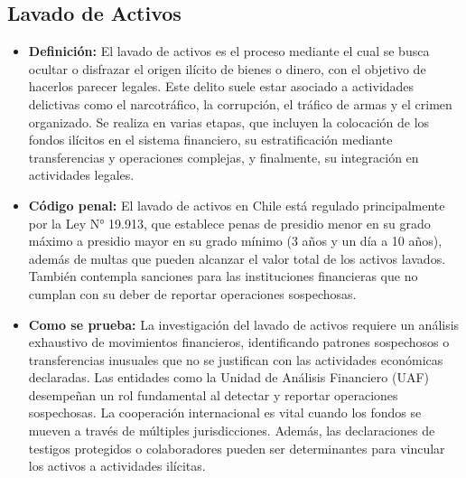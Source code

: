 \documentclass[letter,12pt]{article}
\begin{document}
	\subsection{Lavado de Activos}
	\begin{itemize}
		\item \textbf{Definición: }El lavado de activos es el proceso mediante el cual se busca ocultar o disfrazar el origen ilícito de bienes o dinero, con el objetivo de hacerlos parecer legales. Este delito suele estar asociado a actividades delictivas como el narcotráfico, la corrupción, el tráfico de armas y el crimen organizado. Se realiza en varias etapas, que incluyen la colocación de los fondos ilícitos en el sistema financiero, su estratificación mediante transferencias y operaciones complejas, y finalmente, su integración en actividades legales.\\
		\newpage
		
		\item \textbf{Código penal: }El lavado de activos en Chile está regulado principalmente por la Ley N° 19.913, que establece penas de presidio menor en su grado máximo a presidio mayor en su grado mínimo (3 años y un día a 10 años), además de multas que pueden alcanzar el valor total de los activos lavados. También contempla sanciones para las instituciones financieras que no cumplan con su deber de reportar operaciones sospechosas.\\
		
		\item \textbf{Como se prueba: }La investigación del lavado de activos requiere un análisis exhaustivo de movimientos financieros, identificando patrones sospechosos o transferencias inusuales que no se justifican con las actividades económicas declaradas. Las entidades como la Unidad de Análisis Financiero (UAF) desempeñan un rol fundamental al detectar y reportar operaciones sospechosas. La cooperación internacional es vital cuando los fondos se mueven a través de múltiples jurisdicciones. Además, las declaraciones de testigos protegidos o colaboradores pueden ser determinantes para vincular los activos a actividades ilícitas.\\
		

\end{itemize}
\end{document}
